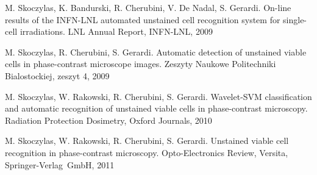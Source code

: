\par
M. Skoczylas, K. Bandurski, R. Cherubini, V. De Nadal, S. Gerardi. On-line results of the INFN-LNL automated unstained cell recognition system for single-cell irradiations. LNL Annual Report, INFN-LNL, 2009

\par
M. Skoczylas, R. Cherubini, S. Gerardi. Automatic detection of unstained viable cells in phase-contrast microscope images. Zeszyty Naukowe Politechniki Bialostockiej, zeszyt 4, 2009

\par
M. Skoczylas, W. Rakowski, R. Cherubini, S. Gerardi. Wavelet-SVM classification and automatic recognition of unstained viable cells in phase-contrast microscopy. Radiation Protection Dosimetry, Oxford Journals, 2010

\par
M. Skoczylas, W. Rakowski, R. Cherubini, S. Gerardi. Unstained viable cell recognition in phase-contrast microscopy. Opto-Electronics Review, Versita, Springer-Verlag~GmbH, 2011
